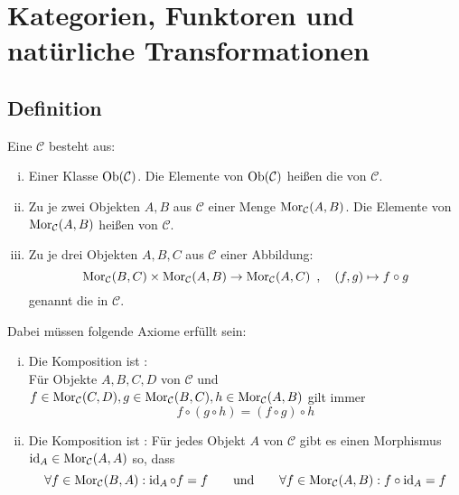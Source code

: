 
\newcommand{\fach}{Topologie \RM{1}.}
\newcommand{\semester}{WiSe 2014/2015}
\newcommand{\homepage}{https://wwwmath.uni-muenster.de/reine/u/topos/lehre/WS2014-2015/Topologie1/Topologie1.html}

\newcommand{\prof}{Prof.\,Dr.\,Arthur Bartels}



\maketitle
\begin{abstract}

\end{abstract}

\setcounter{page}{1}
\tableofcontents
\cleardoubleoddemptypage

\setcounter{page}{1}

\section{Kategorien, Funktoren und natürliche Transformationen} %
\label{sec:1}

\subsection[Definition: Kategorie]{Definition} %
\label{sub:11}
Eine  $\mathcal{C}$ besteht aus:
\begin{enumerate}[i)]
	\item Einer Klasse $\operatorname{Ob}(\mathcal{C})$. Die Elemente von $\operatorname{Ob}(\mathcal{C})$ heißen die  von $\mathcal{C}$.
	\item Zu je zwei Objekten $A,B$ aus $\mathcal{C}$ einer Menge $\operatorname{Mor}_{\mathcal{C}}(A,B)$. Die Elemente von $\operatorname{Mor}_\mathcal{C}(A,B)$ heißen  von
	$\mathcal{C}$.
	\item Zu je drei Objekten $A,B,C$ aus $\mathcal{C}$ einer Abbildung: 
	\[
		\operatorname{Mor}_\mathcal{C}(B,C) \times \operatorname{Mor}_\mathcal{C}(A,B) \to \operatorname{Mor}_\mathcal{C}(A,C) \enspace, \quad (f,g) \mapsto f \circ g
	\]
	genannt die  in $\mathcal{C}$. 
\end{enumerate}
Dabei müssen folgende Axiome  erfüllt sein:
\begin{enumerate}[(i)]
	\item Die Komposition ist : \\ Für Objekte $A,B,C,D$ von $\mathcal{C}$ und 
	$f \in \operatorname{Mor}_\mathcal{C}(C,D), g \in \operatorname{Mor}_\mathcal{C}(B,C), h \in \operatorname{Mor}_\mathcal{C}(A,B)$ gilt immer
	\[
		f \circ (g \circ h) = (f \circ g) \circ h
	\]
	\item Die Komposition ist : Für jedes Objekt $A$ von $\mathcal{C}$ gibt es einen Morphismus $\operatorname{id}_A \in \operatorname{Mor}_\mathcal{C}(A,A)$ so, dass
	\[
		\forall f \in \operatorname{Mor}_\mathcal{C}(B,A) : \operatorname{id}_A \circ f = f  \qquad  \text{und} \qquad  \forall f \in \operatorname{Mor}_\mathcal{C}(A,B) : f \circ \operatorname{id}_A = f
	\]
\end{enumerate}

